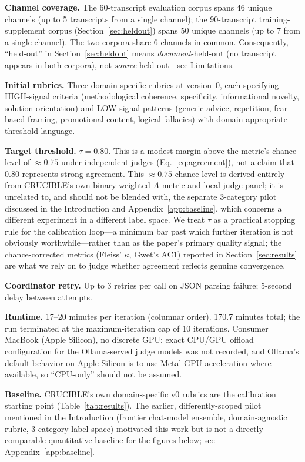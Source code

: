 \documentclass[11pt]{article}
\begin{document}
\textbf{Channel coverage.} The 60-transcript evaluation corpus spans 46
unique channels (up to 5 transcripts from a single channel); the
90-transcript training-supplement corpus (Section~\ref{sec:heldout}) spans
50 unique channels (up to 7 from a single channel). The two corpora share 6
channels in common. Consequently, ``held-out'' in
Section~\ref{sec:heldout} means \emph{document}-held-out (no transcript
appears in both corpora), not \emph{source}-held-out---see Limitations.

\textbf{Initial rubrics.} Three domain-specific rubrics at version~0, each
specifying HIGH-signal criteria (methodological coherence, specificity,
informational novelty, solution orientation) and LOW-signal patterns (generic
advice, repetition, fear-based framing, promotional content, logical fallacies)
with domain-appropriate threshold language.

\textbf{Target threshold.} $\tau = 0.80$. This is a modest margin above the
metric's chance level of $\approx 0.75$ under independent judges
(Eq.~\ref{eq:agreement}), not a claim that $0.80$ represents strong
agreement. This $\approx 0.75$ chance level is derived entirely from
CRUCIBLE's own binary weighted-$A$ metric and local judge panel; it is
unrelated to, and should not be blended with, the separate 3-category
pilot discussed in the Introduction and Appendix~\ref{app:baseline}, which
concerns a different experiment in a different label space. We treat
$\tau$ as a practical stopping rule for the calibration
loop---a minimum bar past which further iteration is not obviously
worthwhile---rather than as the paper's primary quality signal; the
chance-corrected metrics (Fleiss' $\kappa$, Gwet's AC1) reported in
Section~\ref{sec:results} are what we rely on to judge whether agreement
reflects genuine convergence.

\textbf{Coordinator retry.} Up to 3 retries per call on JSON parsing failure;
5-second delay between attempts.

\textbf{Runtime.} 17--20 minutes per iteration (columnar order). 170.7 minutes
total; the run terminated at the maximum-iteration cap of 10 iterations.
Consumer MacBook (Apple Silicon), no discrete GPU; exact CPU/GPU offload
configuration for the Ollama-served judge models was not recorded, and
Ollama's default behavior on Apple Silicon is to use Metal GPU
acceleration where available, so ``CPU-only'' should not be assumed.

\textbf{Baseline.} CRUCIBLE's own domain-specific v0 rubrics are the
calibration starting point (Table~\ref{tab:results}). The earlier,
differently-scoped pilot mentioned in the Introduction (frontier chat-model
ensemble, domain-agnostic rubric, 3-category label space) motivated this
work but is not a directly comparable quantitative baseline for the
figures below; see Appendix~\ref{app:baseline}.
\end{document}
